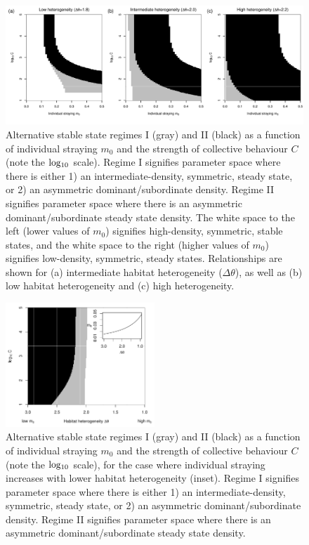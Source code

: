 \documentclass{revtex4}
\begin{document}
\begin{figure}
  \captionsetup{justification=raggedright,
singlelinecheck=false
}
\centering
\includegraphics[width=1\textwidth]{fig_hysteresis_ddm.pdf}
\caption{
Alternative stable state regimes I (gray) and II (black) as a function of individual straying $m_0$ and the strength of collective behaviour $C$ (note the $\rm log_{10}$ scale).
Regime I signifies parameter space where there is either 1) an intermediate-density, symmetric, steady state, or 2) an asymmetric dominant/subordinate density.
Regime II signifies parameter space where there is an asymmetric dominant/subordinate steady state density.
The white space to the left (lower values of $m_0$) signifies high-density, symmetric, stable states, and the white space to the right (higher values of $m_0$) signifies low-density, symmetric, steady states.
Relationships are shown for (a) intermediate habitat heterogeneity ($\Delta\theta$), as well as (b) low habitat heterogeneity and (c) high heterogeneity.
} \label{fig:bifurcationsddm}
\end{figure}


\begin{figure}
  \captionsetup{justification=raggedright,
singlelinecheck=false
}
\centering
\includegraphics[width=0.5\textwidth]{fig_hysteresis_ddm_mtheta.pdf}
\caption{
Alternative stable state regimes I (gray) and II (black) as a function of individual straying $m_0$ and the strength of collective behaviour $C$ (note the $\rm log_{10}$ scale), for the case where individual straying increases with lower habitat heterogeneity (inset).
Regime I signifies parameter space where there is either 1) an intermediate-density, symmetric, steady state, or 2) an asymmetric dominant/subordinate density.
Regime II signifies parameter space where there is an asymmetric dominant/subordinate steady state density.
} \label{fig:mtheta}
\end{figure}
\end{document}
